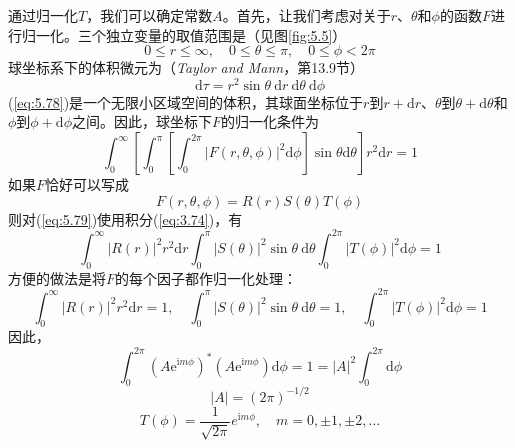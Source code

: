     通过归一化$T$，我们可以确定常数$A$。首先，让我们考虑对关于$r$、$\theta$和$\phi$的函数$F$进行归一化。三个独立变量的取值范围是（见图\ref{fig:5.5}）
    \begin{equation}
        \boxed{
            0 \le r \le \infty, \quad 0 \le \theta \le \pi, \quad 0 \le \phi < 2\pi
        }
        \label{eq:5.77}
    \end{equation}
    球坐标系下的体积微元为（\textit{Taylor and Mann}，第13.9节）
    \begin{equation}
        \boxed{
            \mathrm{d}\tau = r^2\sin\theta \: \mathrm{d}r \: \mathrm{d}\theta \: \mathrm{d}\phi
        }
        \label{eq:5.78}
    \end{equation}
    (\ref{eq:5.78})是一个无限小区域空间的体积，其球面坐标位于$r$到$r+\mathrm{d}r$、$\theta$到$\theta+\mathrm{d}\theta$和$\phi$到$\phi+\mathrm{d}\phi$之间。因此，球坐标下$F$的归一化条件为
    \begin{equation}
        \int_{0}^{\infty}\left[\int_{0}^{\pi}\left[\int_{0}^{2\pi}\left|F\left(r,\theta,\phi\right)\right|^2 \mathrm{d}\phi\right]\sin\theta \mathrm{d}\theta\right]r^2\mathrm{d}r = 1
        \label{eq:5.79}
    \end{equation}
    如果$F$恰好可以写成
    \begin{equation*}
        F\left(r,\theta,\phi\right) = R\left(r\right)S\left(\theta\right)T\left(\phi\right)
    \end{equation*}
    则对(\ref{eq:5.79})使用积分(\ref{eq:3.74})，有
    \begin{equation*}
        \int_{0}^{\infty}\left|R\left(r\right)\right|^2 r^2 \mathrm{d}r \int_{0}^{\pi}\left|S\left(\theta\right)\right|^2 \sin\theta \: \mathrm{d}\theta \int_{0}^{2\pi}\left|T\left(\phi\right)\right|^2 \mathrm{d}\phi = 1
    \end{equation*}
    方便的做法是将$F$的每个因子都作归一化处理：
    \begin{equation}
        \int_{0}^{\infty}\left|R\left(r\right)\right|^2 r^2 \mathrm{d}r = 1, \quad \int_{0}^{\pi}\left|S\left(\theta\right)\right|^2 \sin\theta \: \mathrm{d}\theta = 1, \quad \int_{0}^{2\pi}\left|T\left(\phi\right)\right|^2 \mathrm{d}\phi = 1
        \label{eq:5.80}
    \end{equation}
    因此，
    \begin{equation*}
        \int_{0}^{2\pi}\left(A\mathrm{e}^{\mathrm{i}m\phi}\right)^{\ast}\left(A\mathrm{e}^{\mathrm{i}m\phi}\right) \mathrm{d}\phi = 1 = \left|A\right|^2\int_{0}^{2\pi} \mathrm{d}\phi
    \end{equation*}
    \begin{equation*}
        \left|A\right| = \left(2\pi\right)^{-1/2}
    \end{equation*}
    \begin{equation}
        T\left(\phi\right) = \frac{1}{\sqrt{2\pi}}e^{\mathrm{i}m\phi}, \quad m = 0, \pm 1, \pm 2, \ldots
        \label{eq:5.81}
    \end{equation}

